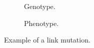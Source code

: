 \begin{figure}[htb]
    \begin{mdframed}
        \begin{subfigure}[b]{0.45\textwidth}
            \centering
            \resizebox{1\textwidth}{!}{}
            \caption{Genotype.}
            \label{link_genotype}
        \end{subfigure}
        \begin{subfigure}[b]{0.45\textwidth}
            \centering
            \resizebox{0.65\textwidth}{!}{}
            \caption{Phenotype.}
            \label{link_phenotype}
        \end{subfigure}
    \end{mdframed}
    \caption{Example of a link mutation.}
    \label{link_mutation}
\end{figure}
